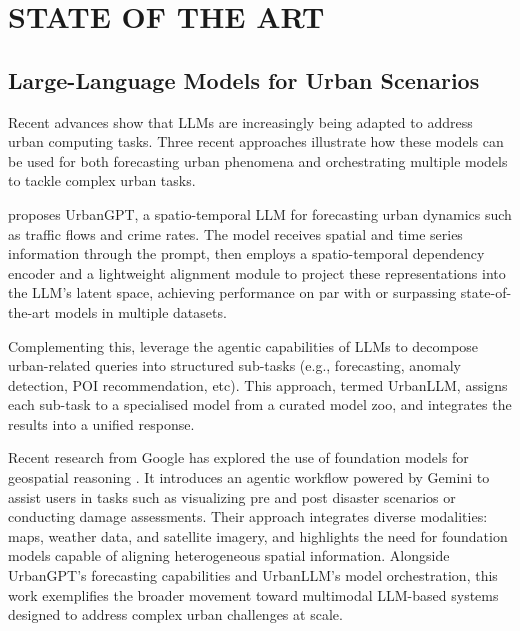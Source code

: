 \chapter{ STATE OF THE ART}


\section{Large-Language Models for Urban Scenarios}

Recent advances show that LLMs are increasingly being adapted to address urban computing tasks. Three recent approaches illustrate how these models can be used for both forecasting urban phenomena and orchestrating multiple models to tackle complex urban tasks.

\cite{Li2024UrbanGPT} proposes UrbanGPT, a spatio-temporal LLM for forecasting urban dynamics such as traffic flows and crime rates. The model receives spatial and time series information through the prompt, then employs a spatio-temporal dependency encoder and a lightweight alignment module to project these representations into the LLM's latent space, achieving performance on par with or surpassing state-of-the-art models in multiple datasets. 

Complementing this, \cite{Jiang2024UrbanLLM} leverage the agentic capabilities of LLMs to decompose urban-related queries into structured sub-tasks (e.g., forecasting, anomaly detection, POI recommendation, etc). This approach, termed UrbanLLM, assigns each sub-task to a specialised model from a curated model zoo, and integrates the results into a unified response.

Recent research from Google has explored the use of foundation models for geospatial reasoning \cite{2025GoogleGeospatialReasoning}. It introduces an agentic workflow powered by Gemini to assist users in tasks such as visualizing pre and post disaster scenarios or conducting damage assessments. Their approach integrates diverse modalities: maps, weather data, and satellite imagery, and highlights the need for foundation models capable of aligning heterogeneous spatial information. Alongside UrbanGPT's forecasting capabilities and UrbanLLM's model orchestration, this work exemplifies the broader movement toward multimodal LLM-based systems designed to address complex urban challenges at scale.

